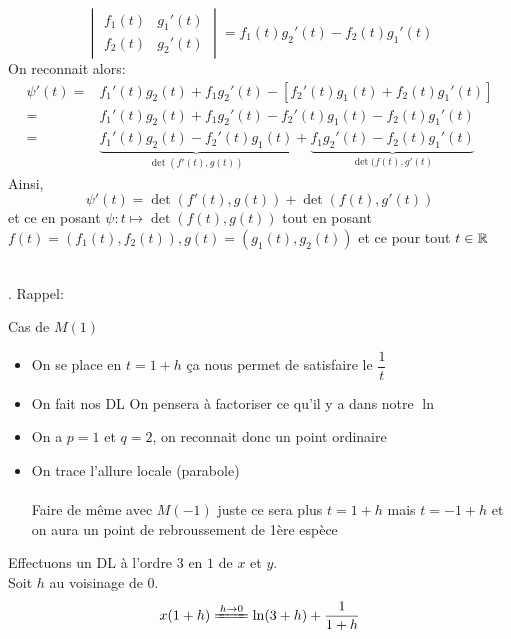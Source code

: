 \documentclass{article}
\begin{document}
{\begin{demomethode}{}
{{{$$\begin{vmatrix}
		f_1(t) & g_1'(t)\\ f_2(t) & g_2'(t)\end{vmatrix}=f_1(t)g_2'(t)-f_2(t)g_1'(t)$$
		On reconnait alors:
		\begin{align*}
		\psi'(t)=&f_1'(t)g_2(t)+f_1g_2'(t)-\left[f_2'\left(t\right)g_1(t)+f_2(t)g_1'(t)\right]\\
		=& f_1'(t)g_2(t)+f_1g_2'(t)-f_2'\left(t\right)g_1(t)-f_2(t)g_1'(t)\\
		=& \underbrace{f_1'(t)g_2(t)-f_2'\left(t\right)g_1(t)}_{\det(f'(t),g(t))}+\underbrace{f_1g_2'(t)-f_2(t)g_1'(t)}_{\det(f(t),g'(t)}
		\end{align*}
Ainsi,
$$\boxed{\psi'(t)=\det(f'(t),g(t))+\det(f(t),g'(t))}$$		
		}{et ce en posant $\psi:t\mapsto \det(f(t),g(t))$}	
	}{tout en posant $f(t)=(f_1(t),f_2(t)),g(t)=(g_1(t),g_2(t))$}
}{et ce pour tout $t\in\mathbb{R}$}
\end{demomethode}\pagebreak
{}\\
. \hfill Rappel: \href{https://1drv.ms/b/c/7e66df76a526ba79/IQDGI4ukOeMMRblxG_1sm0oSAflf_rlHMEyRKOFjhgNI8VM?e=RlXmOA}{}
\begin{demomethode}{Cas de $M(1)$}{
\begin{itemize}
\item On se place en $t=1+h$
\iitem ça nous permet de satisfaire le $\dfrac{1}{t}$
\item On fait nos DL
\iitem On pensera à factoriser ce qu'il y a dans notre $\ln$
\item On a $p=1$ et $q=2$, on reconnait donc un point ordinaire
\item On trace l'allure locale (parabole)\\\\
{\footnotesize Faire de même avec $M(-1)$ juste ce sera plus $t=1+h$ mais $t=-1+h$ et on aura un point de rebroussement de 1ère espèce}
\end{itemize}
}
Effectuons un DL à l'ordre 3 en $1$ de $x$ et $y$.\\
Soit $h$ au voisinage de $0$.
\begin{align*}
x(1+h)&\xeq{h\to 0} \ln(3+h)+\dfrac{1}{1+h}\\

\end{align*}
\end{demomethode}}
\end{document}
